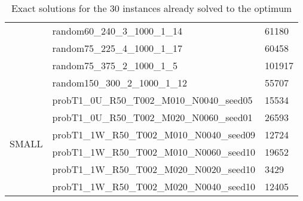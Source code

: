 \begin{table}[]
{\begin{tabular}{@{}lll@{}}
            & random60\_240\_3\_1000\_1\_14              & 61180  \\
            & random75\_225\_4\_1000\_1\_17              & 60458  \\
            & random75\_375\_2\_1000\_1\_5               & 101917 \\
            & random150\_300\_2\_1000\_1\_12             & 55707  \\ \midrule
            \multirow{6}{*}{SMALL} & probT1\_0U\_R50\_T002\_M010\_N0040\_seed05 & 15534  \\
            & probT1\_0U\_R50\_T002\_M020\_N0060\_seed01 & 26593  \\
            & probT1\_1W\_R50\_T002\_M010\_N0040\_seed09 & 12724  \\
            & probT1\_1W\_R50\_T002\_M010\_N0060\_seed10 & 19652  \\
            & probT1\_1W\_R50\_T002\_M020\_N0020\_seed10 & 3429   \\
            & probT1\_1W\_R50\_T002\_M020\_N0040\_seed10 & 12405  \\ \bottomrule
        \end{tabular}
    }
    \caption{Exact solutions for the 30 instances already solved to the optimum}
    \label{tab:exact_opt}
\end{table}
